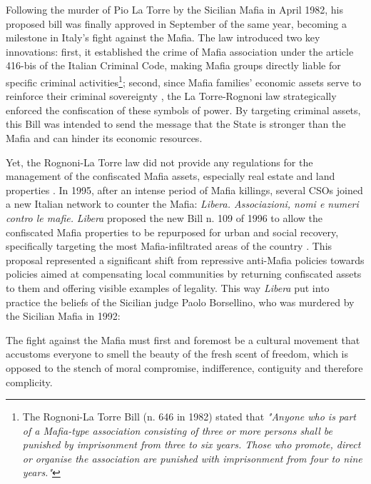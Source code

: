 \documentclass[12pt]{article}
\theoremstyle{plain}
\theoremstyle{plain}
\theoremstyle{plain}
\theoremstyle{definition}
\theoremstyle{plain}
\theoremstyle{definition}
\theoremstyle{plain}
\theoremstyle{remark}
\theoremstyle{definition}
\theoremstyle{definition}
\theoremstyle{plain}
\begin{document}
\normalsize
Following the murder of Pio La Torre by the Sicilian Mafia in April 1982, his proposed bill was finally approved in September of the same year, becoming a milestone in Italy's fight against the Mafia. The law introduced two key innovations: first, it established the crime of Mafia association under the article 416-bis of the Italian Criminal Code, making Mafia groups directly liable for specific criminal activities\footnote{The Rognoni-La Torre Bill (n. 646 in 1982) stated that \emph{"Anyone who is part of a Mafia-type association consisting of three or more persons shall be punished by imprisonment from three to six years. Those who promote, direct or organise the association are punished with imprisonment from four to nine years."}}; second, since Mafia families' economic assets serve to reinforce their criminal sovereignty \citep{operti_tough_2018, mosca_social_2017}, the La Torre-Rognoni law strategically enforced the confiscation of these symbols of power. By targeting criminal assets, this Bill was intended to send the message that the State is stronger than the Mafia and can hinder its economic resources.  \par
\medskip
Yet, the Rognoni-La Torre law did not provide any regulations for the management of the confiscated Mafia assets, especially real estate and land properties \citep{menditto_quale_2013, nazzaro_il_2021}.
In 1995, after an intense period of Mafia killings, several CSOs joined a new Italian network to counter the Mafia: \emph{Libera. Associazioni, nomi e numeri contro le mafie.} \emph{Libera} proposed the new Bill n. 109 of 1996 to allow the confiscated Mafia properties to be repurposed for urban and social recovery, specifically targeting the most Mafia-infiltrated areas of the country \citep{nazzaro_il_2021, falcone_beneitalia_2016}. This proposal represented a significant shift from repressive anti-Mafia policies towards policies aimed at compensating local communities by returning confiscated assets to them and offering visible examples of legality. This way \emph{Libera} put into practice the beliefs of the Sicilian judge Paolo Borsellino, who was murdered by the Sicilian Mafia in 1992: \par
\vspace{0.3cm}

\small %
The fight against the Mafia must first and foremost be a cultural movement that accustoms everyone to smell the beauty of the fresh scent of freedom, which is opposed to the stench of moral compromise, indifference, contiguity and therefore complicity.
\end{document}
